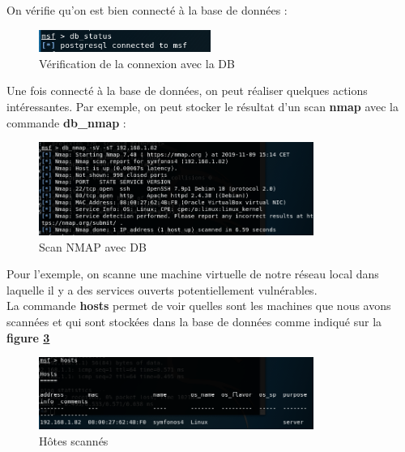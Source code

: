  On vérifie qu'on est bien connecté à la base de données :

\begin{figure}[htp!]
  \centering
  \setlength\figureheight{7cm}
  \setlength\figurewidth{9cm}
  \includegraphics[width=0.5\textwidth]{oui/Ancien/imangeancien/metasploit/db_status2.PNG}
  \caption{Vérification de la connexion avec la DB}
  \label{fig:courbe-tikz}
\end{figure}

Une fois connecté à la base de données, on peut réaliser quelques actions intéressantes. Par exemple, on peut stocker le résultat d'un scan \textbf{nmap} avec la commande \textbf{db\_nmap} :

\begin{figure}[htp!]
  \centering
  \setlength\figureheight{7cm}
  \setlength\figurewidth{9cm}
  \includegraphics[width=0.8\textwidth]{oui/Ancien/imangeancien/metasploit/db_nmap.PNG}
  \caption{Scan NMAP avec DB}
  \label{fig:courbe-tikz}
\end{figure}

Pour l'exemple, on scanne une machine virtuelle de notre réseau local dans laquelle il y a des services ouverts potentiellement vulnérables.\\

La commande \textbf{hosts} permet de voir quelles sont les machines que nous avons scannées et qui sont stockées dans la base de données comme indiqué sur la \textbf{figure \ref{fig:meta-hote}}\\

\begin{figure}[h]
  \centering
  \setlength\figureheight{7cm}
  \setlength\figurewidth{9cm}
  \includegraphics[width=0.8\textwidth]{oui/Ancien/imangeancien/metasploit/db_hosts.PNG}
  \caption{Hôtes scannés}
  \label{fig:meta-hote}
\end{figure}

